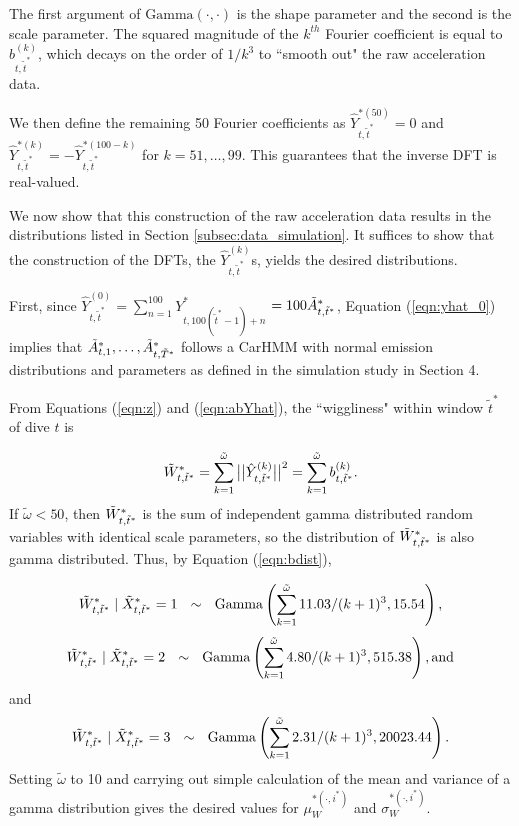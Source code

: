 The first argument of $\mathrm{Gamma}(\cdot,\cdot)$ is the shape parameter and the second is the scale parameter. The squared magnitude of the $k^{th}$ Fourier coefficient is equal to $b^{(k)}_{t,\tilde t^*}$, which decays on the order of $1/k^3$ to ``smooth out" the raw acceleration data.

We then define the remaining 50 Fourier coefficients as $\hat{Y}^{*(50)}_{t,\tilde t^*} = 0$ and $\hat{Y}^{*(k)}_{t,\tilde t^*} = -\hat{Y}^{*(100-k)}_{t,\tilde t^*}$ for $k = 51,\ldots,99$. This guarantees that the inverse DFT is real-valued. 
  

We now show that this construction of the raw acceleration data results in the distributions listed in Section \ref{subsec:data_simulation}. It suffices to show that the construction of the DFTs, the $\hat{Y}^{(k)}_{t,\tilde t^*}$s, yields the desired distributions.

First, since $\hat{Y}^{(0)}_{t,\tilde t^*} = \sum_{n=1}^{100} Y^*_{t,100(\tilde t^* - 1) + n} $ $=100\tilde{A}^*_{t,\tilde{t}^*}$, Equation (\ref{eqn:yhat_0}) implies that 
$\tilde{A}^*_{t,1}, \ldots, \tilde{A}^*_{t,\tilde{T}^*}$ 
follows a CarHMM with normal emission distributions and parameters as defined in the simulation study in Section 4.

From Equations (\ref{eqn:z}) and (\ref{eqn:abYhat}), 
the ``wiggliness" within window $\tilde t^*$ of dive $t$ is 

\[
    \tilde{W}^*_{t,\tilde t^*} = \sum_{k=1}^{\tilde \omega} \big|\big|\hat{Y}^{(k)}_{t,\tilde t^*}\big|\big|^2 =  \sum_{k=1}^{\tilde \omega} b^{(k)}_{t,\tilde t^*}.
\]
%
If $\tilde \omega < 50$, then $\tilde{W}^*_{t,\tilde t^*}$ is the sum of independent gamma distributed random variables with identical scale parameters, so the distribution of $\tilde{W}^*_{t,\tilde t^*}$ is also gamma distributed. Thus, by Equation (\ref{eqn:bdist}),

\[
    \tilde{W}^*_{t,\tilde t^*} \mid \tilde X^*_{t,\tilde t^*} = 1  ~~ \sim ~~ {\rm{Gamma}}\left(\sum_{k=1}^{\tilde \omega} 11.03/(k+1)^3 , 15.54 \right),
\]
%
\[
    \tilde{W}^*_{t,\tilde t^*} \mid \tilde X^*_{t,\tilde t^*} = 2 ~~\sim~~ {\rm{Gamma}}\left(\sum_{k=1}^{\tilde \omega} 4.80/(k+1)^3 , 515.38 \right), \text{and}
\]
and
\[
    \tilde{W}^*_{t,\tilde t^*} \mid \tilde X^*_{t,\tilde t^*} = 3  ~~ \sim ~~ {\rm{Gamma}}\left(\sum_{k=1}^{\tilde \omega} 2.31/(k+1)^3 , 20023.44 \right).
\]
Setting $\tilde \omega$ to 10 and carrying out simple calculation of the mean and variance of a gamma distribution gives the desired values for $\mu_W^{*(\cdot,i^*)}$ and $\sigma_W^{*(\cdot,i^*)}$.

